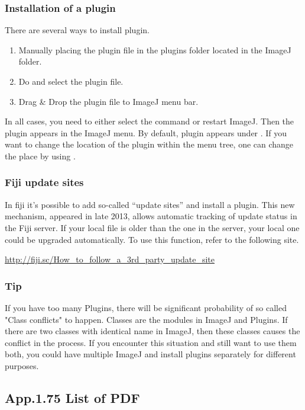 \subsubsection{Installation of a plugin}

There are several ways to install plugin. 
\begin{enumerate}
\item Manually placing the plugin file in the plugins folder located in the ImageJ folder.
\item Do  and select the plugin file.
\item Drag \& Drop the plugin file to ImageJ menu bar. 
\end{enumerate}

In all cases, you need to either select the command  or restart ImageJ. Then the plugin appears in the ImageJ menu. By default, plugin appears under
\ijmenu{[Plugins]}.
If you want to change the location of the plugin within the menu tree, one can change the place by using .

\subsubsection{Fiji update sites}

In fiji it's possible to add so-called ``update sites'' and install a plugin. This new mechanism, appeared in late 2013, allows automatic tracking of update status in the Fiji server. If your local file is older than the one in the server, your local one could be upgraded automatically. To use this function, refer to the following site. 

\url{http://fiji.sc/How_to_follow_a_3rd_party_update_site}

\subsubsection{Tip}
If you have too many Plugins, there will be significant probability of so called
"Class conflicts" to happen. Classes are the modules in ImageJ and Plugins. 
If there are two classes with identical name in
ImageJ, then these classes causes the conflict in the process. If you encounter this situation and still want to use them both, you could have multiple ImageJ and install plugins separately for different purposes. 


\clearpage
\subsection{App.1.75 List of PDF}
\label{app1.75the }

